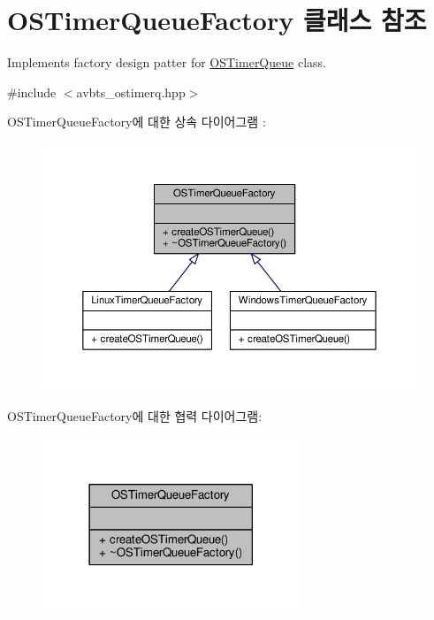 \hypertarget{class_o_s_timer_queue_factory}{}\section{O\+S\+Timer\+Queue\+Factory 클래스 참조}
\label{class_o_s_timer_queue_factory}


Implements factory design patter for \hyperlink{class_o_s_timer_queue}{O\+S\+Timer\+Queue} class.  




{\ttfamily \#include $<$avbts\+\_\+ostimerq.\+hpp$>$}



O\+S\+Timer\+Queue\+Factory에 대한 상속 다이어그램 \+: 
\nopagebreak
\begin{figure}[H]
\begin{center}
\leavevmode
\includegraphics[width=350pt]{class_o_s_timer_queue_factory__inherit__graph}
\end{center}
\end{figure}


O\+S\+Timer\+Queue\+Factory에 대한 협력 다이어그램\+:
\nopagebreak
\begin{figure}[H]
\begin{center}
\leavevmode
\includegraphics[width=218pt]{class_o_s_timer_queue_factory__coll__graph}
\end{center}
\end{figure}
